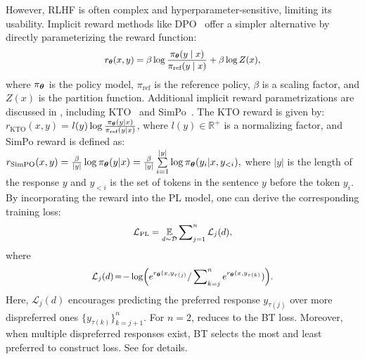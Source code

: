 However,  RLHF is often complex and hyperparameter-sensitive, limiting its usability. Implicit reward methods like  DPO~\cite{dpo}  offer a simpler alternative by directly parameterizing the reward function:
\begin{equation}  
	\fontsize{9}{3}\selectfont{
		\label{dporm}
		\begin{aligned}
			r_{\mathbf{\wm}}(x, y) = \beta \log \frac{\pi_\wm(y \mid x)}{\pi_{\text{ref}}(y \mid x)} + \beta \log Z(x), 
	\end{aligned}}
\end{equation}  
where \( \pi_{\boldsymbol{\theta}} \) is the policy model, \( \pi_{\text{ref}} \) is the reference policy, \( \beta \) is a scaling factor, and \( Z(x) \) is the partition function. Additional implicit reward parametrizations are discussed in , including KTO~\cite{kto} and SimPo~\cite{simpo}. The KTO reward is given by: $r_{\text{KTO}}(x,y)$$=$$l(y) \log \frac{\pi_{{\boldsymbol{\theta}}}(y|x)}{\pi_{\text{ref}}(y|x)}$, where \( l(y)\in\mathbb{R}^+ \) is a normalizing factor, and SimPo reward is defined as: $r_{\text{SimPO}}(x,y)=\frac{\beta}{|y|}\log \pi_{{\boldsymbol{\theta}}}(y|x)=\frac{\beta}{|y|}\sum\limits^{|y|}_{i=1}\log \pi_{{\boldsymbol{\theta}}}(y_{i}|x,y_{<i}),$ where $|y|$ is the length of the response $y$ and $y_{<i}$ is the set of tokens in the sentence $y$ before the token $y_{i}$. By incorporating the reward into the PL model, one can derive the corresponding training  loss:
\begin{equation}
\vspace{-1.5pt}
	\fontsize{9}{3}\selectfont{
		\begin{aligned}
			\label{eq:dpoPL}
			\mathcal{L}_{\text{PL}}=\expectation_{d\sim\mathcal{D}}  \sum\nolimits_{j=1}^{n} \mathcal{L}_{j}(d),
	\end{aligned}}
\end{equation}
where
\begin{equation} 
\vspace{-0.5pt}
	\fontsize{9}{3}\selectfont{
		\label{eq:PL}
		\begin{aligned}
			\mathcal{L}_{j}(d) \!= \!-\log\!\Big({e^{r_{\wm} (x,y_{\tau(j)}} / \sum\nolimits_{k=j}^{n}e^{r_{\wm} (x,y_{\tau(k)}})}\Big).
	\end{aligned}}
\end{equation}
 Here, \( \mathcal{L}_{j}(d) \) encourages predicting the preferred response \( y_{\tau(j)} \) over more  dispreferred ones $\{y_{\tau\left(k\right)}\}_{k=j+1}^{n}$. For \( n=2 \),  reduces to the BT loss. Moreover, when multiple dispreferred responses exist, BT selects the most and least preferred to construct loss. See  for details.
 
